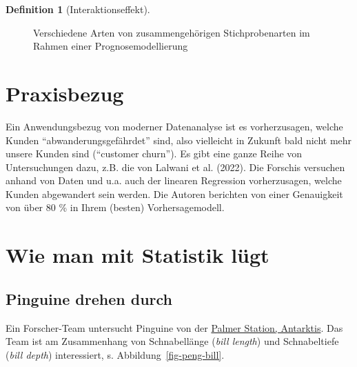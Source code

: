 \documentclass[
  letterpaper,
]{scrbook}
\theoremstyle{definition}
\theoremstyle{definition}
\theoremstyle{definition}
\newtheorem{definition}{Definition}[chapter]
\theoremstyle{remark}
\begin{document}
\begin{definition}[Interaktionseffekt]
\begin{figure}

\caption{\label{fig-sample-types}Verschiedene Arten von
zusammengehörigen Stichprobenarten im Rahmen einer Prognosemodellierung}

\end{figure}%

\section{Praxisbezug}\label{praxisbezug-4}

Ein Anwendungsbezug von moderner Datenanalyse ist es vorherzusagen,
welche Kunden \enquote{abwanderungsgefährdet} sind, also vielleicht in
Zukunft bald nicht mehr unsere Kunden sind (\enquote{customer churn}).
Es gibt eine ganze Reihe von Untersuchungen dazu, z.B. die von Lalwani
et al. (2022). Die Forschis versuchen anhand von Daten und u.a. auch der
linearen Regression vorherzusagen, welche Kunden abgewandert sein
werden. Die Autoren berichten von einer Genauigkeit von über 80 \% in
Ihrem (besten) Vorhersagemodell.

\section{Wie man mit Statistik
lügt}\label{wie-man-mit-statistik-luxfcgt-5}

\subsection{Pinguine drehen durch}\label{pinguine-drehen-durch}

Ein Forscher-Team untersucht Pinguine von der
\href{https://pallter.marine.rutgers.edu/}{Palmer Station, Antarktis}.
Das Team ist am Zusammenhang von Schnabellänge (\emph{bill length}) und
Schnabeltiefe (\emph{bill depth}) interessiert, s.
Abbildung~\ref{fig-peng-bill}.


\end{definition}
\end{document}
